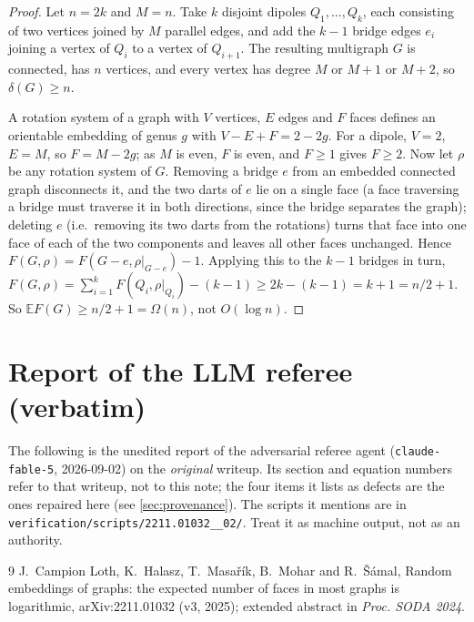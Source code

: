 \documentclass[11pt,a4paper]{article}
\theoremstyle{plain}
\theoremstyle{definition}
\theoremstyle{remark}
\newcommand{\E}{\mathbb E}
\begin{document}
\label{pf:multi}
\propmulti*
\begin{proof}
Let $n=2k$ and $M=n$. Take $k$ disjoint dipoles $Q_1,\dots,Q_k$, each consisting of two vertices joined by $M$ parallel edges, and add the $k-1$ bridge edges $e_i$ joining a vertex of $Q_i$ to a vertex of $Q_{i+1}$. The resulting multigraph $G$ is connected, has $n$ vertices, and every vertex has degree $M$ or $M+1$ or $M+2$, so $\delta(G)\ge n$.

A rotation system of a graph with $V$ vertices, $E$ edges and $F$ faces defines an orientable embedding of genus $g$ with $V-E+F=2-2g$. For a dipole, $V=2$, $E=M$, so $F=M-2g$; as $M$ is even, $F$ is even, and $F\ge1$ gives $F\ge2$. Now let $\rho$ be any rotation system of $G$. Removing a bridge $e$ from an embedded connected graph disconnects it, and the two darts of $e$ lie on a single face (a face traversing a bridge must traverse it in both directions, since the bridge separates the graph); deleting $e$ (i.e.\ removing its two darts from the rotations) turns that face into one face of each of the two components and leaves all other faces unchanged. Hence $F(G,\rho)=F(G-e,\rho|_{G-e})-1$. Applying this to the $k-1$ bridges in turn, $F(G,\rho)=\sum_{i=1}^kF(Q_i,\rho|_{Q_i})-(k-1)\ge2k-(k-1)=k+1=n/2+1$. So $\E F(G)\ge n/2+1=\Omega(n)$, not $O(\log n)$.
\end{proof}

\section{Report of the LLM referee (verbatim)}\label{app:referee}

\begin{tcolorbox}[colback=gray!8,colframe=gray!50,boxrule=0.4pt,arc=2pt]
\small The following is the unedited report of the adversarial referee agent (\texttt{claude-fable-5}, 2026-09-02) on the \emph{original} writeup. Its section and equation numbers refer to that writeup, not to this note; the four items it lists as defects are the ones repaired here (see \cref{sec:provenance}). The scripts it mentions are in \texttt{verification/scripts/2211.01032\_\_02/}. Treat it as machine output, not as an authority.
\end{tcolorbox}



\begin{thebibliography}{9}
 J.~Campion Loth, K.~Halasz, T.~Masařík, B.~Mohar and R.~Šámal, Random embeddings of graphs: the expected number of faces in most graphs is logarithmic, arXiv:2211.01032 (v3, 2025); extended abstract in \emph{Proc. SODA 2024}.
\end{thebibliography}
\end{document}

